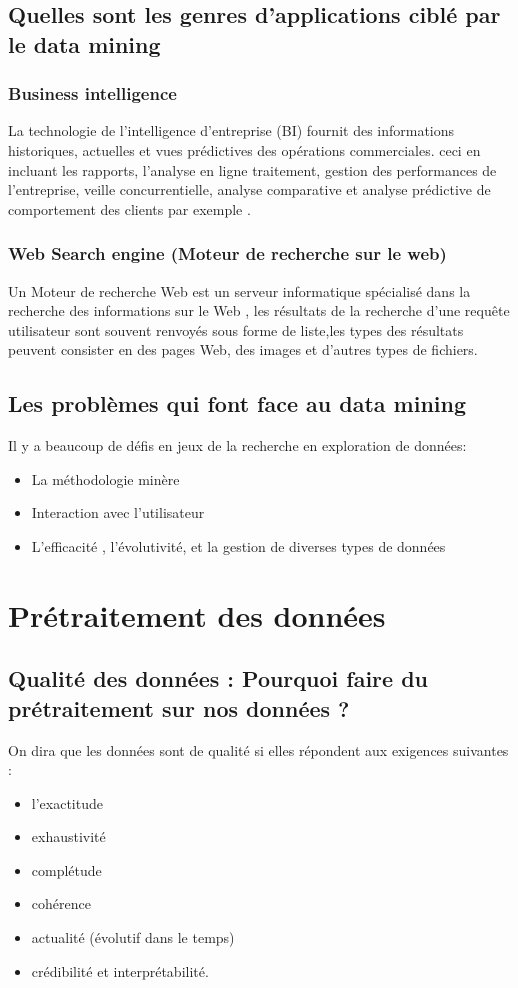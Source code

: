 \documentclass[12pt,a4paper,oneside]{book}
\begin{document}
    \section{Quelles sont les genres d'applications ciblé par le data mining}
     \subsection{Business intelligence}
     La technologie de l'intelligence d'entreprise  (BI) fournit des informations historiques, actuelles et
     vues prédictives des opérations commerciales. 
     ceci en incluant les rapports, l'analyse en ligne
     traitement, gestion des performances de l'entreprise, veille concurrentielle, analyse comparative et analyse prédictive de comportement des clients par exemple .
     \subsection{Web  Search engine (Moteur de recherche sur le web)}
     Un Moteur de recherche Web est un serveur informatique spécialisé dans la recherche des informations sur le Web , les résultats de la recherche d’une requête utilisateur sont souvent renvoyés sous forme de liste,les types des résultats peuvent consister en des pages Web, des images et d’autres types de fichiers.
    \section{Les problèmes qui font face au data mining}
    Il y a beaucoup de défis en jeux de la recherche en exploration de données:
    \begin{itemize}
    \item  La méthodologie minère
    \item Interaction avec l'utilisateur
    \item  L'efficacité , l'évolutivité, et la gestion de diverses types de données
    \end{itemize}
 
    \chapter{Prétraitement des données}
    \section{Qualité des données : Pourquoi faire du prétraitement sur nos données ?}
    On dira que les données sont de qualité si elles répondent aux exigences suivantes :
    \begin{itemize}
  
    \item l'exactitude
    \item  exhaustivité
      \item complétude
      \item  cohérence
      \item actualité (évolutif dans le temps)
      \item crédibilité et interprétabilité.
  
    \end{itemize}    
   
\end{document}

